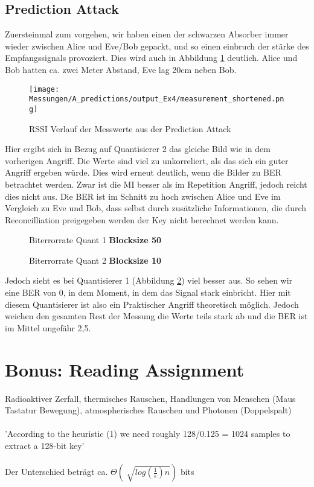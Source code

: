\documentclass[12pt,a4paper]{article}
\begin{document}
\subsection*{Prediction Attack}
Zuersteinmal zum vorgehen, wir haben einen der schwarzen Absorber immer wieder zwischen Alice und Eve/Bob gepackt, und so einen einbruch der stärke des Empfangssignals provoziert. Dies wird auch in Abbildung \ref{fig:12} deutlich. Alice und Bob hatten ca. zwei Meter Abstand, Eve lag 20cm neben Bob.\\
\begin{figure}[H]
\centering
\texttt{[image: Messungen/A\_predictions/output\_Ex4/measurement\_shortened.png]}
\caption{RSSI Verlauf der Messwerte aus der Prediction Attack}
\label{fig:12}
\end{figure}
Hier ergibt sich in Bezug auf Quantisierer 2 das gleiche Bild wie in dem vorherigen Angriff. Die Werte sind viel zu unkorreliert, als das sich ein guter Angriff ergeben würde. Dies wird erneut deutlich, wenn die Bilder zu BER betrachtet werden. Zwar ist die MI besser als im Repetition Angriff, jedoch reicht dies nicht aus. Die BER ist im Schnitt zu hoch zwischen Alice und Eve im Vergleich zu Eve und Bob, dass selbst durch zusätzliche Informationen, die durch Reconcilliation preigegeben werden der Key nicht berechnet werden kann.
\begin{figure}[H]
\centering
{} \qquad
{}  
\caption{Biterrorrate Quant 1 \textbf{Blocksize 50}}
\label{fig:13}
\end{figure}
\begin{figure}[H]
\centering
{} \qquad
{}  
\caption{Biterrorrate Quant 2 \textbf{Blocksize 10}}
\label{fig:14}
\end{figure}
Jedoch sieht es bei Quantisierer 1 (Abbildung \ref{fig:13}) viel besser aus. So sehen wir eine BER von 0, in dem Moment, in dem das Signal stark einbricht. Hier mit diesem Quantisierer ist also ein Praktischer Angriff theoretisch möglich. Jedoch weichen den gesamten Rest der Messung die Werte teils stark ab und die BER ist im Mittel ungefähr 2,5. 
\newpage
\section{Bonus: Reading Assignment}
Radioaktiver Zerfall, thermisches Rauschen, Handlungen von Menschen (Maus Tastatur Bewegung), atmospherisches Rauschen und Photonen (Doppelspalt)\\
\\
'According to the heuristic (1) we need roughly 128/0.125 = 1024
samples to extract a 128-bit key'\\
\\
Der Unterschied beträgt ca. $\Theta\left(\sqrt[]{log(\frac{1}{\epsilon})n}\right)$ bits
\end{document}
